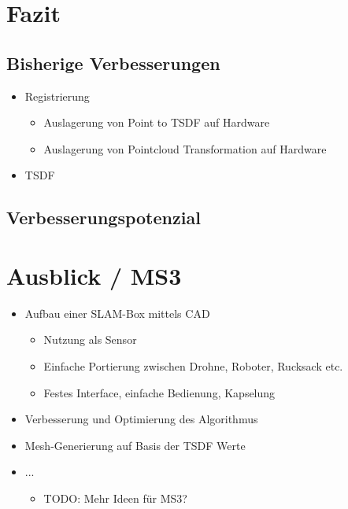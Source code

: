 \documentclass{beamer}
\begin{document}
\section{Fazit}
\begin{frame}{}
\begin{center}
\end{center}
\end{frame}

\subsection{Bisherige Verbesserungen}
\begin{frame}{\subsecname}
\begin{itemize}
\item{Registrierung}
\begin{itemize}
\item{Auslagerung von Point to TSDF auf Hardware}
\item{Auslagerung von Pointcloud Transformation auf Hardware}
\end{itemize}
\item{TSDF}
\end{itemize}
\end{frame}

\subsection{Verbesserungspotenzial}
\begin{frame}{\subsecname}

\end{frame}

\section{Ausblick / MS3}
\begin{frame}{\secname}
\begin{itemize}
\item{Aufbau einer SLAM-Box mittels CAD}
\begin{itemize}
\item{Nutzung als Sensor}
\item{Einfache Portierung zwischen Drohne, Roboter, Rucksack etc.}
\item{Festes Interface, einfache Bedienung, Kapselung}
\end{itemize}
\item{Verbesserung und Optimierung des Algorithmus}
\item{Mesh-Generierung auf Basis der TSDF Werte}
\item{...}
\begin{itemize}
    \item{TODO: Mehr Ideen für MS3?}
\end{itemize}

\end{itemize}
\end{frame}
\end{document}
